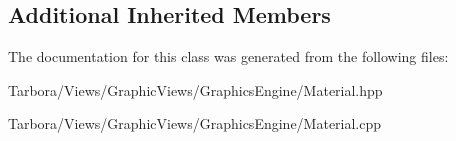 \subsection*{Additional Inherited Members}


The documentation for this class was generated from the following files\+:\begin{DoxyCompactItemize}
\item 
Tarbora/\+Views/\+Graphic\+Views/\+Graphics\+Engine/Material.\+hpp\item 
Tarbora/\+Views/\+Graphic\+Views/\+Graphics\+Engine/Material.\+cpp\end{DoxyCompactItemize}
